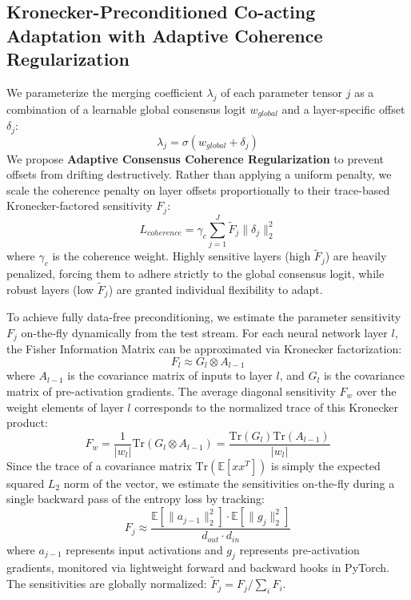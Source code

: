 \documentclass{article}
\theoremstyle{plain}
\theoremstyle{definition}
\theoremstyle{remark}
\begin{document}
\subsection{Kronecker-Preconditioned Co-acting Adaptation with Adaptive Coherence Regularization}
We parameterize the merging coefficient $\lambda_j$ of each parameter tensor $j$ as a combination of a learnable global consensus logit $w_{global}$ and a layer-specific offset $\delta_j$:
\begin{equation}
    \lambda_j = \sigma(w_{global} + \delta_j)
\end{equation}
We propose \textbf{Adaptive Consensus Coherence Regularization} to prevent offsets from drifting destructively. Rather than applying a uniform penalty, we scale the coherence penalty on layer offsets proportionally to their trace-based Kronecker-factored sensitivity $F_j$:
\begin{equation}
    L_{coherence} = \gamma_c \sum_{j=1}^J \tilde{F}_j \|\delta_j\|_2^2
\end{equation}
where $\gamma_c$ is the coherence weight. Highly sensitive layers (high $\tilde{F}_j$) are heavily penalized, forcing them to adhere strictly to the global consensus logit, while robust layers (low $\tilde{F}_j$) are granted individual flexibility to adapt.

To achieve fully data-free preconditioning, we estimate the parameter sensitivity $F_j$ on-the-fly dynamically from the test stream. For each neural network layer $l$, the Fisher Information Matrix can be approximated via Kronecker factorization:
\begin{equation}
    F_l \approx G_l \otimes A_{l-1}
\end{equation}
where $A_{l-1}$ is the covariance matrix of inputs to layer $l$, and $G_l$ is the covariance matrix of pre-activation gradients. The average diagonal sensitivity $F_w$ over the weight elements of layer $l$ corresponds to the normalized trace of this Kronecker product:
\begin{equation}
    F_w = \frac{1}{|w_l|}\text{Tr}(G_l \otimes A_{l-1}) = \frac{\text{Tr}(G_l)\text{Tr}(A_{l-1})}{|w_l|}
\end{equation}
Since the trace of a covariance matrix $\text{Tr}(\mathbb{E}[xx^T])$ is simply the expected squared $L_2$ norm of the vector, we estimate the sensitivities on-the-fly during a single backward pass of the entropy loss by tracking:
\begin{equation}
    F_j \approx \frac{\mathbb{E}[\|a_{j-1}\|_2^2] \cdot \mathbb{E}[\|g_j\|_2^2]}{d_{out} \cdot d_{in}}
\end{equation}
where $a_{j-1}$ represents input activations and $g_j$ represents pre-activation gradients, monitored via lightweight forward and backward hooks in PyTorch. The sensitivities are globally normalized: $\tilde{F}_j = F_j / \sum_{i} F_i$.
\end{document}
